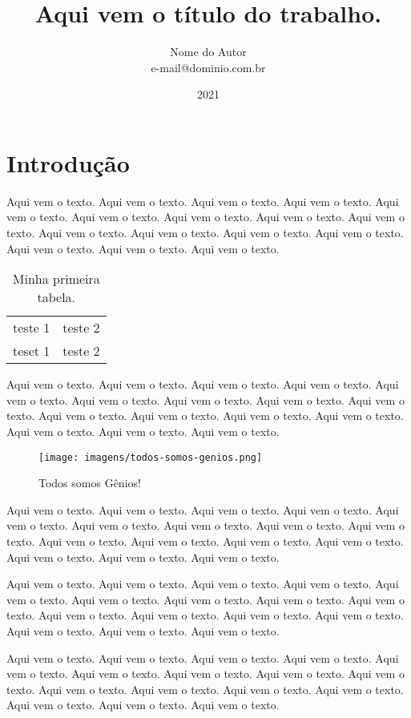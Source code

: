 \documentclass[a4paper, 12pt]{article}
\title{Aqui vem o título do trabalho.}
\author{Nome do Autor \\ e-mail@dominio.com.br}
\date{2021}
\begin{document}
\maketitle
\tableofcontents \newpage
\listoffigures \newpage
\listoftables \newpage

\section{Introdução}

Aqui vem o texto. Aqui vem o texto. Aqui vem o texto. Aqui vem o texto.
Aqui vem o texto. Aqui vem o texto. Aqui vem o texto. Aqui vem o texto.
Aqui vem o texto. Aqui vem o texto. Aqui vem o texto. Aqui vem o texto.
Aqui vem o texto. Aqui vem o texto. Aqui vem o texto. Aqui vem o texto. \cite{meuatalho}

\begin{table}[htb]
 \centering
 \begin{tabular}{|c|c|}
  teste 1 & teste 2 \\
  teset 1 & teste 2 \\ 
 \end{tabular}
 \caption{Minha primeira tabela.}
 \label{minha-tabela}
\end{table}

Aqui vem o texto. Aqui vem o texto. Aqui vem o texto. Aqui vem o texto.
Aqui vem o texto. Aqui vem o texto. Aqui vem o texto. Aqui vem o texto.
Aqui vem o texto. Aqui vem o texto. Aqui vem o texto. Aqui vem o texto.
Aqui vem o texto. Aqui vem o texto. Aqui vem o texto. Aqui vem o texto.

\begin{figure}[htb]
 \centering
 \texttt{[image: imagens/todos-somos-genios.png]}
 \caption{Todos somos Gênios!}
 \label{figura-genios}
\end{figure}

Aqui vem o texto. Aqui vem o texto. Aqui vem o texto. Aqui vem o texto.
Aqui vem o texto. Aqui vem o texto. Aqui vem o texto. Aqui vem o texto.
Aqui vem o texto. Aqui vem o texto. Aqui vem o texto. Aqui vem o texto.
Aqui vem o texto. Aqui vem o texto. Aqui vem o texto. Aqui vem o texto.

Aqui vem o texto. Aqui vem o texto. Aqui vem o texto. Aqui vem o texto.
Aqui vem o texto. Aqui vem o texto. Aqui vem o texto. Aqui vem o texto.
Aqui vem o texto. Aqui vem o texto. Aqui vem o texto. Aqui vem o texto.
Aqui vem o texto. Aqui vem o texto. Aqui vem o texto. Aqui vem o texto.

Aqui vem o texto. Aqui vem o texto. Aqui vem o texto. Aqui vem o texto.
Aqui vem o texto. Aqui vem o texto. Aqui vem o texto. Aqui vem o texto.
Aqui vem o texto. Aqui vem o texto. Aqui vem o texto. Aqui vem o texto.
Aqui vem o texto. Aqui vem o texto. Aqui vem o texto. Aqui vem o texto.
\end{document}
